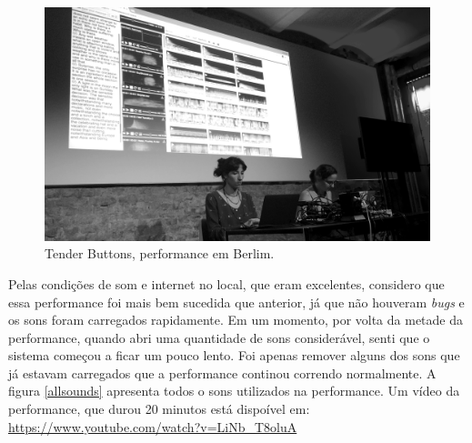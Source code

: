 \begin{figure}
\includegraphics[width=1\linewidth]{pictures/cap4/tenderbuttonsberlim}
\caption{Tender Buttons, performance em Berlim.}
\label{tenderbuttonsberlim}
\end{figure}


Pelas condições de som e internet no local, que eram excelentes, considero que essa performance foi mais bem sucedida que anterior, já que não houveram \emph{bugs} e os sons foram carregados rapidamente. Em um momento, por volta da metade da performance, quando abri uma quantidade de sons considerável, senti que o sistema começou a ficar um pouco lento. Foi apenas remover alguns dos sons que já estavam carregados que a performance continou correndo normalmente. A figura \ref{allsounds} apresenta todos o sons utilizados na performance. Um vídeo da performance, que durou 20 minutos está dispoível em: \url{https://www.youtube.com/watch?v=LiNb_T8oluA}

